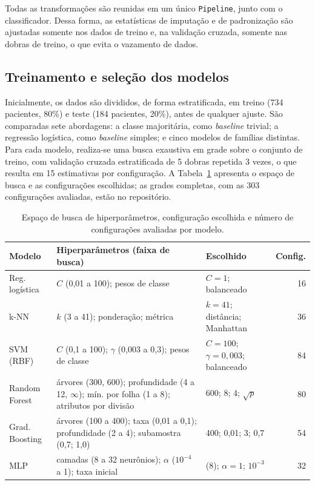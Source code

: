 \documentclass[12pt]{article}
\begin{document}
Todas as transformações são reunidas em um único \texttt{Pipeline}, junto
com o classificador. Dessa forma, as estatísticas de imputação e de
padronização são ajustadas somente nos dados de treino e, na validação
cruzada, somente nas dobras de treino, o que evita o vazamento de dados.

\subsection{Treinamento e seleção dos modelos}

Inicialmente, os dados são divididos, de forma estratificada, em treino
(734 pacientes, 80\%) e teste (184 pacientes, 20\%), antes de qualquer
ajuste. São comparadas sete abordagens: a classe majoritária, como
\textit{baseline} trivial; a regressão logística, como \textit{baseline}
simples; e cinco modelos de famílias distintas. Para cada modelo, realiza-se
uma busca exaustiva em grade sobre o conjunto de treino, com validação
cruzada estratificada de 5 dobras repetida 3 vezes, o que resulta em 15
estimativas por configuração. A Tabela~\ref{tab:grades} apresenta o espaço de
busca e as configurações escolhidas; as grades completas, com as 303
configurações avaliadas, estão no repositório.

\begin{table}[!htb]
\centering
\caption{Espaço de busca de hiperparâmetros, configuração escolhida e número
de configurações avaliadas por modelo.}
\label{tab:grades}
\footnotesize\setlength{\tabcolsep}{4pt}
\begin{tabular}{@{}lp{6.9cm}p{3.9cm}r@{}}
\toprule
Modelo & Hiperparâmetros (faixa de busca) & Escolhido & Config. \\
\midrule
Reg. logística & $C$ (0,01 a 100); pesos de classe & $C{=}1$; balanceado & 16 \\
k-NN & $k$ (3 a 41); ponderação; métrica & $k{=}41$; distância; Manhattan & 36 \\
SVM (RBF) & $C$ (0,1 a 100); $\gamma$ (0,003 a 0,3); pesos de classe & $C{=}100$; $\gamma{=}0{,}003$; balanceado & 84 \\
Random Forest & árvores (300, 600); profundidade (4 a 12, $\infty$); mín. por folha (1 a 8); atributos por divisão & 600; 8; 4; $\sqrt{p}$ & 80 \\
Grad. Boosting & árvores (100 a 400); taxa (0,01 a 0,1); profundidade (2 a 4); subamostra (0,7; 1,0) & 400; 0,01; 3; 0,7 & 54 \\
MLP & camadas (8 a 32 neurônios); $\alpha$ ($10^{-4}$ a 1); taxa inicial & (8); $\alpha{=}1$; $10^{-3}$ & 32 \\
\bottomrule
\end{tabular}
\end{table}
\end{document}
